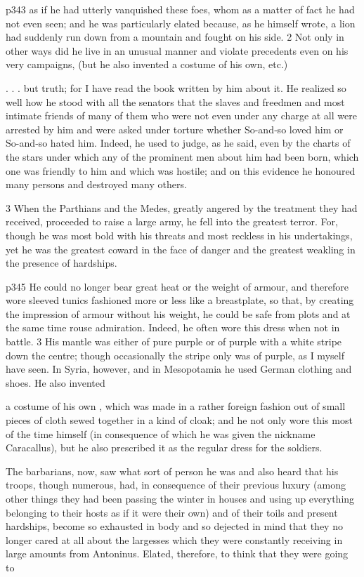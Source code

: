 p343 as if he had utterly vanquished these foes, whom as a matter of fact he had not even seen; and he was particularly elated because, as he himself wrote, a lion had suddenly run down from a mountain and fought on his side. 2
Not only in other ways did he live in an unusual manner and violate precedents even on his very campaigns, (but he also invented a costume of his own, etc.)

. . . but truth; for I have read the book written by him about it. He realized so well how he stood with all the senators that the slaves and freedmen and most intimate friends of many of them who were not even under any charge at all were arrested by him and were asked under torture whether So-and\texthebrew{‑}so loved him or So-and\texthebrew{‑}so hated him. Indeed, he used to judge, as he said, even by the charts of the stars under which any of the prominent men about him had been born, which one was friendly to him and which was hostile; and on this evidence he honoured many persons and destroyed many others.

3
When the Parthians and the Medes, greatly angered by the treatment they had received, proceeded to raise a large army, he fell into the greatest terror. For, though he was most bold with his threats and most reckless in his undertakings, yet he was the greatest coward in the face of danger and the greatest weakling in the presence of hardships.

p345 He could no longer bear great heat or the weight of armour, and therefore wore sleeved tunics fashioned more or less like a breastplate, so that, by creating the impression of armour without his weight, he could be safe from plots and at the same time rouse admiration. Indeed, he often wore this dress when not in battle. 3 His mantle was either of pure purple or of purple with a white stripe down the centre; though occasionally the stripe only was of purple, as I myself have seen. In Syria, however, and in Mesopotamia he used German clothing and shoes. He also invented

a costume of his own , which was made in a rather foreign fashion out of small pieces of cloth sewed together in a kind of cloak; and he not only wore this most of the time himself (in consequence of which he was given the nickname Caracallus), but he also prescribed it as the regular dress for the soldiers.

The barbarians, now, saw what sort of person he was and also heard that his troops, though numerous, had, in consequence of their previous luxury (among other things they had been passing the winter in houses and using up everything belonging to their hosts as if it were their own) and of their toils and present hardships, become so exhausted in body and so dejected in mind that they no longer cared at all about the largesses which they were constantly receiving in large amounts from Antoninus. Elated, therefore, to think that they were going to

